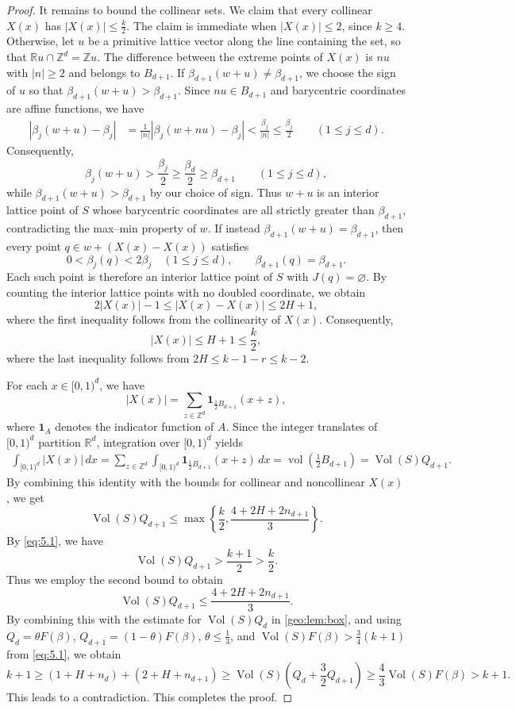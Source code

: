 \documentclass[reqno, 11pt]{article}
\numberwithin{equation}{section}
\theoremstyle{definition}
\newcommand{\R}{\mathbb R}
\newcommand{\Z}{\mathbb Z}
\begin{document}
\begin{proof}
It remains to bound the collinear sets. We claim that every collinear
$X(x)$ has $|X(x)|\le \frac{k}{2}$.
The claim is immediate when $|X(x)|\le2$, since $k\ge 4$. Otherwise, let $u$ be a primitive lattice vector
along the line containing the set, so that $\R u\cap\Z^d=\Z u$.
The difference between the extreme points of $X(x)$ is $nu$ with
$|n|\ge2$ and belongs to $B_{d+1}$.
If $\beta_{d+1}(w+u)\neq\beta_{d+1}$, we choose the sign of $u$ so that $\beta_{d+1}(w+u)>\beta_{d+1}$. Since $nu\in B_{d+1}$ and barycentric coordinates are affine functions, we have
\[
\begin{aligned}
|\beta_j(w+u)-\beta_j|
&=\frac{1}{|n|}|\beta_j(w+nu)-\beta_j|<\frac{\beta_j}{|n|}
\le\frac{\beta_j}{2}
\qquad(1\le j\le d).
\end{aligned}
\]
Consequently,
\[
\beta_j(w+u)>\frac{\beta_j}{2}
\ge\frac{\beta_d}{2}\ge\beta_{d+1}
\qquad(1\le j\le d),
\]
while $\beta_{d+1}(w+u)>\beta_{d+1}$ by our choice of sign.
Thus $w+u$ is an interior lattice point of $S$ whose barycentric coordinates are all strictly greater than $\beta_{d+1}$, contradicting the max--min property of $w$.
If instead $\beta_{d+1}(w+u)=\beta_{d+1}$, then every point $q\in w+\left(X(x)-X(x)\right)$ satisfies
\[
0<\beta_j(q)<2\beta_j\quad (1\le j\le d), \qquad \beta_{d+1}(q)=\beta_{d+1}.
\]
Each such point is therefore an interior lattice point of $S$ with $J(q)=\varnothing$. By counting the interior lattice points with no doubled coordinate, we obtain 
\[
2|X(x)|-1\le |X(x)-X(x)|\le 2H+1,
\]
where the first inequality follows from the collinearity of $X(x)$. Consequently,
\[
|X(x)|\le H+1\le \frac{k}{2},
\]
where the last inequality follows from $2H\le k-1-r\le k-2$.

For each $x\in[0,1)^d$, we have
\[
|X(x)|=\sum_{z\in\mathbb Z^d}
\mathbf{1}_{\frac12B_{d+1}}(x+z),
\]
where $\mathbf{1}_A$ denotes the indicator function of $A$. Since the integer translates of $[0,1)^d$ partition $\mathbb R^d$, integration over $[0,1)^d$ yields
\[
\begin{aligned}
 \int_{[0,1)^d}|X(x)|\,dx
 =\sum_{z\in\mathbb Z^d}
   \int_{[0,1)^d}
   \mathbf{1}_{\frac12B_{d+1}}(x+z)\,dx
 =\operatorname{vol}(\frac12B_{d+1})
 =\operatorname{Vol}(S)Q_{d+1}.
\end{aligned}
\]
By combining this identity with the bounds for collinear
and noncollinear $X(x)$, we get 
\[
 \operatorname{Vol}(S)Q_{d+1}\le\max\left\{\frac{k}{2},\frac{4+2H+2n_{d+1}}{3}\right\}.
\]
By \eqref{eq:5.1}, we have
\[
\operatorname{Vol}(S)Q_{d+1}>\frac{k+1}{2}>\frac{k}{2}.
\]
Thus we employ the second bound to obtain 
\[
\operatorname{Vol}(S)Q_{d+1}\le\frac{4+2H+2n_{d+1}}{3}.
\]
By combining this with the estimate for $\operatorname{Vol}(S)Q_d$ in \cref{geo:lem:box}, and using $Q_d=\theta F(\beta)$, $Q_{d+1}=(1-\theta)F(\beta)$, $\theta\le\frac13$, and $\operatorname{Vol}(S)F(\beta)>\frac34(k+1)$ from \eqref{eq:5.1}, we obtain
\[
k+1\ge (1+H+n_d)+(2+H+n_{d+1})
\ge \operatorname{Vol}(S)\left(Q_d+\frac32Q_{d+1}\right)
\ge\frac43\operatorname{Vol}(S)F(\beta)>k+1.
\]
This leads to a contradiction.
This completes the proof.
\end{proof}
\end{document}

